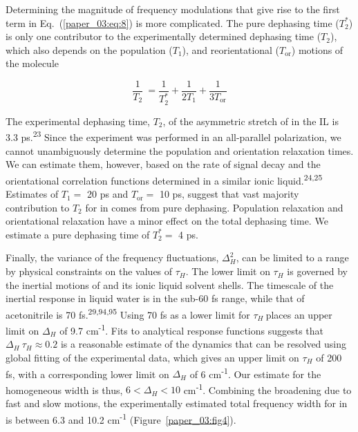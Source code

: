 \documentclass[]{article}
\begin{document}
Determining the magnitude of frequency modulations that give rise to the first term in Eq.~(\ref{paper_03:eq:8}) is more complicated. The pure dephasing time (\(T_{2}^{*}\)) is only one contributor to the experimentally determined dephasing time (\(T_{2}\)), which also depends on the population (\(T_{1}\)), and reorientational (\(T_{\text{or}}\)) motions of the molecule

\begin{equation}
  \label{paper_03:eq:9}
  \frac{1}{T_{2}}\  = \frac{1}{T_{2}^{*}} + \frac{1}{2T_{1}} + \frac{1}{3T_{\text{or}}}
\end{equation}

The experimental dephasing time, \(T_{2}\), of the asymmetric stretch of  in the \ce{[C4C1im][PF6]} IL is 3.3 ps.\textsuperscript{23} Since the experiment was performed in an all-parallel polarization, we cannot unambiguously determine the population and orientation relaxation times. We can estimate them, however, based on the rate of signal decay and the orientational correlation functions determined in a similar ionic liquid.\textsuperscript{24,25} Estimates of \(T_{1} =\) 20 ps and \(T_{\mathrm{\text{or}}} =\) 10 ps, suggest that vast majority contribution to \(T_{2}\) for  in \ce{[C4C1im][PF6]} comes from pure dephasing. Population relaxation and orientational relaxation have a minor effect on the total dephasing time. We estimate a pure dephasing time of \(T_{2}^{*} =\) 4 ps.

Finally, the variance of the frequency fluctuations, \(\Delta_{H}^{2}\), can be limited to a range by physical constraints on the values of \(\tau_{H}\). The lower limit on \(\tau_{H}\) is governed by the inertial motions of  and its ionic liquid solvent shells. The timescale of the inertial response in liquid water is in the sub-60 fs range, while that of acetonitrile is 70 fs.\textsuperscript{29,94,95} Using 70 fs as a lower limit for \(\tau_{H}\ \)places an upper limit on \(\Delta_{H}\) of 9.7 cm\textsuperscript{-1}. Fits to analytical response functions suggests that \(\Delta_{H}\ \tau_{H} \approx 0.2\) is a reasonable estimate of the dynamics that can be resolved using global fitting of the experimental data, which gives an upper limit on \(\tau_{H}\) of 200 fs, with a corresponding lower limit on \(\Delta_{H}\) of 6 cm\textsuperscript{-1}. Our estimate for the homogeneous width is thus, \(6 < \Delta_{H} < 10\) cm\textsuperscript{‑1}. Combining the broadening due to fast and slow motions, the experimentally estimated total frequency width for  in \ce{[C4C1im][PF6]} is between 6.3 and 10.2 cm\textsuperscript{-1} (Figure~\ref{paper_03:fig4}).
\end{document}
